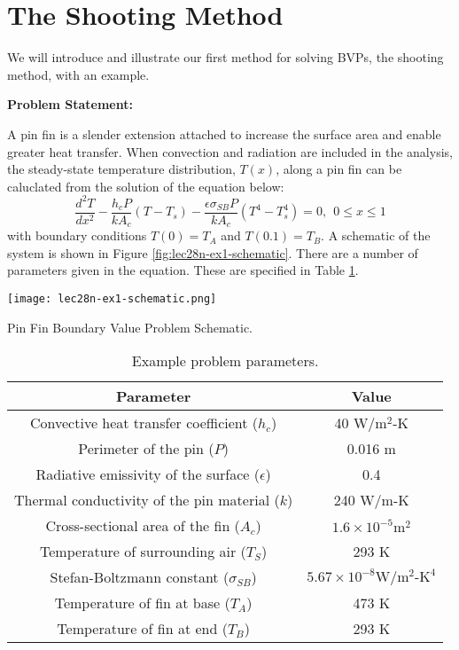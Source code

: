 \section{The Shooting Method}
We will introduce and illustrate our first method for solving BVPs, the shooting method, with an example.

\vspace{0.25cm}

\noindent\textbf{Problem Statement:}

\vspace{0.1cm}

\noindent A pin fin is a slender extension attached to increase the surface area and enable greater heat transfer.  When convection and radiation are included in the analysis, the steady-state temperature distribution, $T(x)$, along a pin fin can be caluclated from the solution of the equation below:
\begin{equation}
\frac{d^2T}{dx^2} - \frac{h_cP}{kA_c}\left(T - T_s\right)-\frac{\epsilon \sigma_{SB}P}{k A_c}\left(T^4 - T_s^4 \right) = 0, \ \ 0 \le x \le 1
\end{equation}
with boundary conditions $T(0)=T_A$ and $T(0.1)=T_B$.  A schematic of the system is shown in Figure \ref{fig:lec28n-ex1-schematic}.  There are a number of parameters given in the equation.  These are specified in Table \ref{tab:lec28n-ex1-parameters}.
\begin{marginfigure}[-4.5cm]
\texttt{[image: lec28n-ex1-schematic.png]}
\caption{Pin Fin Boundary Value Problem Schematic.}
\label{fig:lec28n-ex1-schematic}
\end{marginfigure}

\begin{table}
\begin{tabular}{|c|c|}
\hline
\textbf{Parameter} & \textbf{Value} \\ \hline
Convective heat transfer coefficient ($h_c$) & 40 $\text{W}/\text{m}^2\text{-K}$ \\ \hline
Perimeter of the pin ($P$) & 0.016 m \\ \hline
Radiative emissivity of the surface ($\epsilon$) & 0.4 \\ \hline
Thermal conductivity of the pin material ($k$) & 240 $\text{W}/\text{m-K}$ \\ \hline
Cross-sectional area of the fin ($A_c$) & $1.6 \times 10^{-5} \text{m}^2$ \\ \hline
Temperature of surrounding air ($T_S$) & 293 K \\ \hline
Stefan-Boltzmann constant ($\sigma_{SB}$) & $5.67 \times 10^{-8} \text{W}/\text{m}^2\text{-K}^4$ \\ \hline
Temperature of fin at base ($T_A$) & 473 K \\ \hline
Temperature of fin at end ($T_B$) & 293 K \\ \hline
\end{tabular}
\caption{Example problem parameters.}
\label{tab:lec28n-ex1-parameters}
\end{table}

